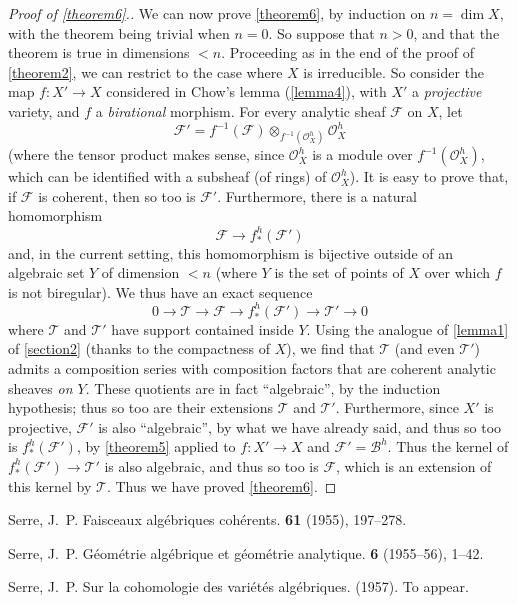 \documentclass{article}
\theoremstyle{plain}
\theoremstyle{definition}
\newcommand{\sh}{\mathscr}
\newcommand{\oldpage}[1]{\marginpar{\footnotesize$\Big\vert$ \textit{p.~#1}}}
\begin{document}
\begin{proof}[Proof of \cref{theorem6}.]
  We can now prove \cref{theorem6}, by induction on $n=\dim X$, with the theorem being trivial when $n=0$.
  So suppose that $n>0$, and that the theorem is true in dimensions $<n$.
  Proceeding as in the end of the proof of \cref{theorem2}, we can restrict to the case where $X$ is irreducible.
  So consider the map $f\colon X'\to X$ considered in Chow's lemma (\cref{lemma4}), with $X'$ a \emph{projective} variety, and $f$ a \emph{birational} morphism.
  For every analytic sheaf $\sh{F}$ on $X$, let
  \[
    \sh{F}' = f^{-1}(\sh{F})\otimes_{f^{-1}(\sh{O}_X^h)}\sh{O}_X^h
  \]
  (where the tensor product makes sense, since $\sh{O}_X^h$ is a module over $f^{-1}(\sh{O}_X^h)$, which can be identified with a subsheaf (of rings) of $\sh{O}_X^h$).
  It is easy to prove that, if $\sh{F}$ is coherent, then so too is $\sh{F}'$.
  Furthermore, there is a natural homomorphism
  \oldpage{2-16}
  \[
    \sh{F} \to f_*^h(\sh{F}')
  \]
  and, in the current setting, this homomorphism is bijective outside of an algebraic set $Y$ of dimension $<n$ (where $Y$ is the set of points of $X$ over which $f$ is not biregular).
  We thus have an exact sequence
  \[
    0 \to \sh{T} \to \sh{F} \to f_*^h(\sh{F}') \to \sh{T}' \to 0
  \]
  where $\sh{T}$ and $\sh{T'}$ have support contained inside $Y$.
  Using the analogue of \cref{lemma1} of \cref{section2} (thanks to the compactness of $X$), we find that $\sh{T}$ (and even $\sh{T}'$) admits a composition series with composition factors that are coherent analytic sheaves \emph{on $Y$}.
  These quotients are in fact ``algebraic'', by the induction hypothesis;
  thus so too are their extensions $\sh{T}$ and $\sh{T}'$.
  Furthermore, since $X'$ is projective, $\sh{F}'$ is also ``algebraic'', by what we have already said, and thus so too is $f_*^h(\sh{F}')$, by \cref{theorem5} applied to $f\colon X'\to X$ and $\sh{F}'=\sh{B}^h$.
  Thus the kernel of $f_*^h(\sh{F}')\to\sh{T}'$ is also algebraic, and thus so too is $\sh{F}$, which is an extension of this kernel by $\sh{T}$.
  Thus we have proved \cref{theorem6}.
\end{proof}



\nocite{*}

\begin{thebibliography}{1}

  {\sc Serre, J.~P.}
  \newblock Faisceaux alg\'{e}briques coh\'{e}rents.
   \textbf{61} (1955), 197--278.

  {\sc Serre, J.~P.}
  \newblock G\'{e}om\'{e}trie alg\'{e}brique et g\'{e}om\'{e}trie analytique.
   \textbf{6} (1955--56), 1--42.

  {\sc Serre, J.~P.}
  \newblock Sur la cohomologie des vari\'{e}t\'{e}s alg\'{e}briques.
   (1957).
  \newblock To appear.

\end{thebibliography}
\end{document}
